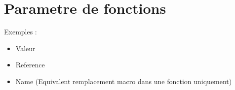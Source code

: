 \documentclass[a4paper,11pt]{article}
\begin{document}
\section{Parametre de fonctions}
Exemples :
\begin{itemize}
  \item Valeur 
  \item Reference 
  \item Name (Equivalent remplacement macro dans une fonction uniquement)  
\end{itemize}
\end{document}
